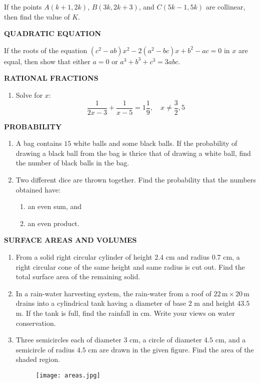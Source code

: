 \documentclass{article}
\begin{document}
If the points $A(k + 1, 2k)$, $B(3k, 2k + 3)$, and $C(5k - 1, 5k)$ are collinear, then find the value of $K$.

\begin{center}
\textbf{QUADRATIC EQUATION}
\end{center}

If the roots of the equation $(c^2 - ab)x^2 - 2(a^2 - bc)x + b^2 - ac = 0$ in $x$ are equal, then show that either $a = 0$ or $a^3 + b^3 + c^3 = 3abc$.

\begin{center}
\textbf{RATIONAL FRACTIONS}
\end{center}

\begin{enumerate}
    \item Solve for $x$: 
    \[
    \frac{1}{2x - 3} + \frac{1}{x - 5} = 1 \frac{1}{9},\quad x \neq \frac{3}{2}, 5
    \]
\end{enumerate}

\begin{center}
\textbf{PROBABILITY}
\end{center}

\begin{enumerate}
    \item A bag contains $15$ white balls and some black balls. If the probability of drawing a black ball from the bag is thrice that of drawing a white ball, find the number of black balls in the bag.
    \item Two different dice are thrown together. Find the probability that the numbers obtained have:
    \begin{enumerate}[label=\roman*.]
        \item an even sum, and
        \item an even product.
    \end{enumerate}
\end{enumerate}

\begin{center}
\textbf{SURFACE AREAS AND VOLUMES}
\end{center}

\begin{enumerate}
    \item From a solid right circular cylinder of height $2.4$ cm and radius $0.7$ cm, a right circular cone of the same height and same radius is cut out. Find the total surface area of the remaining solid.
    \item In a rain-water harvesting system, the rain-water from a roof of $22\,\text{m} \times 20\,\text{m}$ drains into a cylindrical tank having a diameter of base $2$ m and height $43.5$ m. If the tank is full, find the rainfall in cm. Write your views on water conservation.
    \item Three semicircles each of diameter $3$ cm, a circle of diameter $4.5$ cm, and a semicircle of radius $4.5$ cm are drawn in the given figure. Find the area of the shaded region.
        \begin{figure}[h!]
            \centering
            \texttt{[image: areas.jpg]}
        \end{figure}
\end{enumerate}
\end{document}
